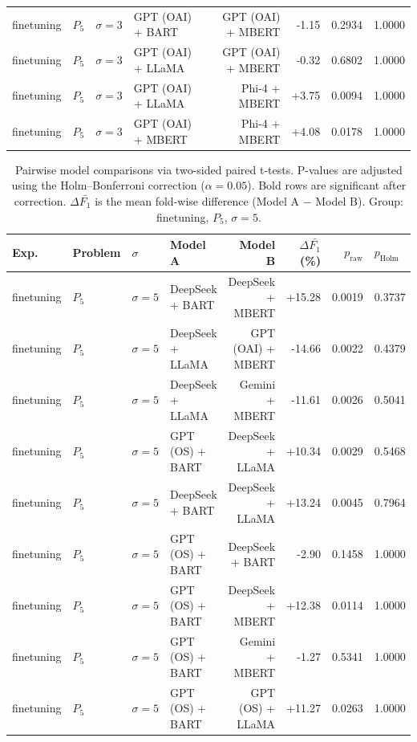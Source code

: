 \begin{table}[htbp]
\begin{tabular*}{\textwidth}{@{\extracolsep{\fill}}llllrrrl}
finetuning & $P_5$ & $\sigma{=}3$ & GPT (OAI) + BART & GPT (OAI) + MBERT & -1.15 & 0.2934 & 1.0000 \\
finetuning & $P_5$ & $\sigma{=}3$ & GPT (OAI) + LLaMA & GPT (OAI) + MBERT & -0.32 & 0.6802 & 1.0000 \\
finetuning & $P_5$ & $\sigma{=}3$ & GPT (OAI) + LLaMA & Phi-4 + MBERT & +3.75 & 0.0094 & 1.0000 \\
finetuning & $P_5$ & $\sigma{=}3$ & GPT (OAI) + MBERT & Phi-4 + MBERT & +4.08 & 0.0178 & 1.0000 \\
\hline
\end{tabular*}
\end{table}
\newpage
\begin{table}[htbp]
\centering
\caption{Pairwise model comparisons via two-sided paired t-tests. P-values are adjusted using the Holm--Bonferroni correction ($\alpha = 0.05$). Bold rows are significant after correction. $\Delta\bar{F_1}$ is the mean fold-wise difference (Model A $-$ Model B). Group: finetuning, $P_5$, $\sigma{=}5$.}
\label{tab:holm_ttests_finetuning_p5_alpha5}
\begin{tabular*}{\textwidth}{@{\extracolsep{\fill}}llllrrrl}
\hline
\textbf{Exp.} & \textbf{Problem} & \textbf{$\sigma$} & \textbf{Model A} & \textbf{Model B} & \textbf{$\Delta \bar{F_1}$ (\%)} & \textbf{$p_\text{raw}$} & \textbf{$p_\text{Holm}$} \\
\hline
finetuning & $P_5$ & $\sigma{=}5$ & DeepSeek + BART & DeepSeek + MBERT & +15.28 & 0.0019 & 0.3737 \\
finetuning & $P_5$ & $\sigma{=}5$ & DeepSeek + LLaMA & GPT (OAI) + MBERT & -14.66 & 0.0022 & 0.4379 \\
finetuning & $P_5$ & $\sigma{=}5$ & DeepSeek + LLaMA & Gemini + MBERT & -11.61 & 0.0026 & 0.5041 \\
finetuning & $P_5$ & $\sigma{=}5$ & GPT (OS) + BART & DeepSeek + LLaMA & +10.34 & 0.0029 & 0.5468 \\
finetuning & $P_5$ & $\sigma{=}5$ & DeepSeek + BART & DeepSeek + LLaMA & +13.24 & 0.0045 & 0.7964 \\
finetuning & $P_5$ & $\sigma{=}5$ & GPT (OS) + BART & DeepSeek + BART & -2.90 & 0.1458 & 1.0000 \\
finetuning & $P_5$ & $\sigma{=}5$ & GPT (OS) + BART & DeepSeek + MBERT & +12.38 & 0.0114 & 1.0000 \\
finetuning & $P_5$ & $\sigma{=}5$ & GPT (OS) + BART & Gemini + MBERT & -1.27 & 0.5341 & 1.0000 \\
finetuning & $P_5$ & $\sigma{=}5$ & GPT (OS) + BART & GPT (OS) + LLaMA & +11.27 & 0.0263 & 1.0000 \\

\end{tabular*}
\end{table}
